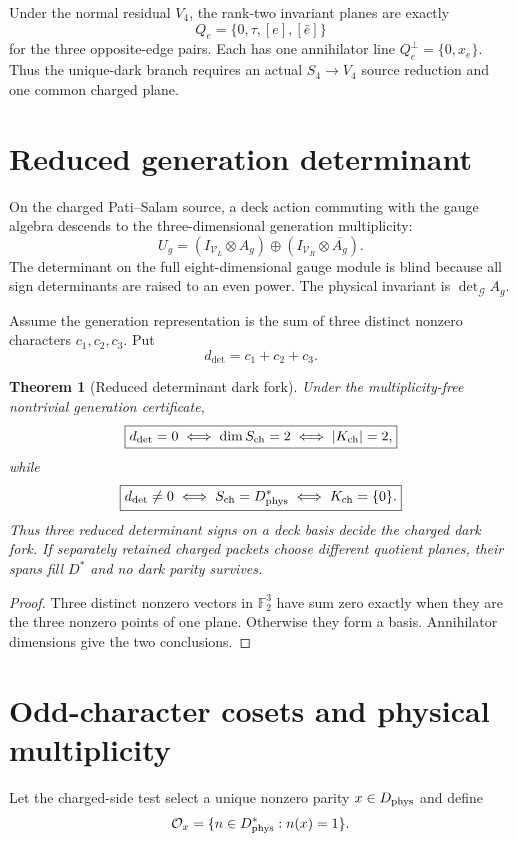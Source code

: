 \documentclass[11pt,oneside,openany]{book}
\numberwithin{equation}{chapter}
\newtheorem{theorem}{Theorem}[chapter]
\theoremstyle{definition}
\theoremstyle{remark}
\newcommand{\Ftwo}{\mathbb F_2}
\begin{document}
Under the normal residual \(V_4\), the rank-two invariant planes are exactly
\[
 \boxed{Q_e=\{0,\tau,[e],[\bar e]\}}
\]
for the three opposite-edge pairs.  Each has one annihilator line
\(Q_e^\perp=\{0,x_e\}\).  Thus the unique-dark branch requires an actual
\(S_4\to V_4\) source reduction and one common charged plane.

\section{Reduced generation determinant}
On the charged Pati--Salam source, a deck action commuting with the gauge
algebra descends to the three-dimensional generation multiplicity:
\[
 U_g=(I_{\mathcal V_L}\otimes A_g)
 \oplus(I_{\mathcal V_R}\otimes\overline{A_g}).
\]
The determinant on the full eight-dimensional gauge module is blind because
all sign determinants are raised to an even power.  The physical invariant is
\(\det_{\mathcal G}A_g\).

Assume the generation representation is the sum of three distinct nonzero
characters \(c_1,c_2,c_3\).  Put
\[
 d_{\det}=c_1+c_2+c_3.
\]

\begin{theorem}[Reduced determinant dark fork]
\label{thm:v5-reduced-determinant}
Under the multiplicity-free nontrivial generation certificate,
\[
 \boxed{
 d_{\det}=0\iff\dim S_{\rm ch}=2\iff|K_{\rm ch}|=2,}
\]
while
\[
 \boxed{
 d_{\det}\ne0\iff S_{\rm ch}=D_{\rm phys}^*\iff K_{\rm ch}=\{0\}.}
\]
Thus three reduced determinant signs on a deck basis decide the charged dark
fork.  If separately retained charged packets choose different quotient
planes, their spans fill \(D^*\) and no dark parity survives.
\end{theorem}

\begin{proof}
Three distinct nonzero vectors in \(\Ftwo^3\) have sum zero exactly when they
are the three nonzero points of one plane.  Otherwise they form a basis.
Annihilator dimensions give the two conclusions.
\end{proof}

\section{Odd-character cosets and physical multiplicity}

Let the charged-side test select a unique nonzero parity
\(x\in D_{\rm phys}\) and define
\[
 \mathcal O_x=\{n\in D_{\rm phys}^*:n(x)=1\}.
\]
\end{document}
